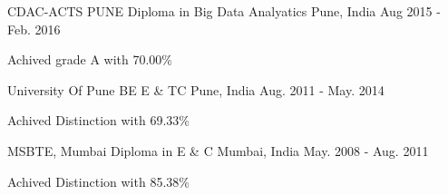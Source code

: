 

\begin{cventries}

 \cventry
    {CDAC-ACTS PUNE} %
    {Diploma in Big Data Analyatics} %
    {Pune, India} %
    {Aug 2015 - Feb. 2016} %
    {
      \begin{cvitems} %
        \item {Achived grade A with 70.00\%}
      \end{cvitems}
    }

  \cventry
    {University Of Pune} %
    {BE E \& TC} %
    {Pune, India} %
    {Aug. 2011 - May. 2014} %
    {
      \begin{cvitems} %
        \item {Achived Distinction with 69.33\%}
      \end{cvitems}
    }

  \cventry
    {MSBTE, Mumbai} %
    {Diploma in  E \& C} %
    {Mumbai, India} %
    {May. 2008 - Aug. 2011} %
    {
      \begin{cvitems} %
        \item {Achived Distinction with 85.38\%}
      \end{cvitems}
    }

\end{cventries}
